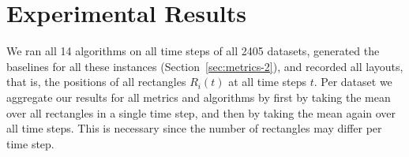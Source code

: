 

\section{Experimental Results}
\label{sec:exploration}

We ran all 14 algorithms on all time steps of all 2405 datasets, generated the baselines for all these instances (Section~\ref{sec:metrics-2}), and recorded all layouts, that is, the positions of all rectangles $R_i(t)$ at all time steps $t$. Per dataset we aggregate our results for all metrics and algorithms by first by taking the mean over all rectangles in a single time step, and then by taking the mean again over all time steps. This is necessary since the number of rectangles may differ per time step. 





